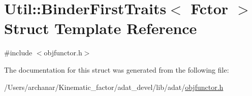\hypertarget{structUtil_1_1Private_1_1BinderFirstTraits}{}\section{Util\+:\+:Binder\+First\+Traits$<$ Fctor $>$ Struct Template Reference}
\label{structUtil_1_1Private_1_1BinderFirstTraits}


{\ttfamily \#include $<$objfunctor.\+h$>$}



The documentation for this struct was generated from the following file\+:\begin{DoxyCompactItemize}
\item 
/\+Users/archanar/\+Kinematic\+\_\+factor/adat\+\_\+devel/lib/adat/\mbox{\hyperlink{lib_2adat_2objfunctor_8h}{objfunctor.\+h}}\end{DoxyCompactItemize}

